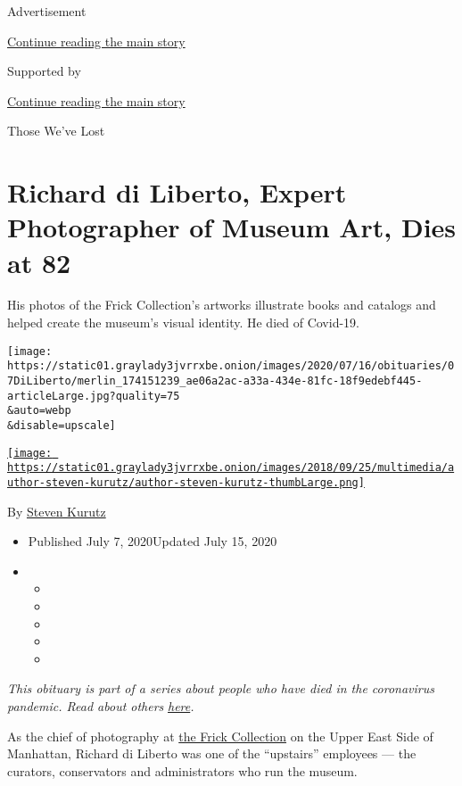 Advertisement

\protect\hyperlink{after-top}{Continue reading the main story}

Supported by

\protect\hyperlink{after-sponsor}{Continue reading the main story}

Those We've Lost

\hypertarget{richard-di-liberto-expert-photographer-of-museum-art-dies-at-82}{%
\section{Richard di Liberto, Expert Photographer of Museum Art, Dies at
82}\label{richard-di-liberto-expert-photographer-of-museum-art-dies-at-82}}

His photos of the Frick Collection's artworks illustrate books and
catalogs and helped create the museum's visual identity. He died of
Covid-19.

\texttt{[image: https://static01.graylady3jvrrxbe.onion/images/2020/07/16/obituaries/07DiLiberto/merlin\_174151239\_ae06a2ac-a33a-434e-81fc-18f9edebf445-articleLarge.jpg?quality=75\\\&auto=webp\\\&disable=upscale]}

\href{https://www.nytimes3xbfgragh.onion/by/steven-kurutz}{\texttt{[image: https://static01.graylady3jvrrxbe.onion/images/2018/09/25/multimedia/author-steven-kurutz/author-steven-kurutz-thumbLarge.png]}}

By \href{https://www.nytimes3xbfgragh.onion/by/steven-kurutz}{Steven
Kurutz}

\begin{itemize}
\item
  Published July 7, 2020Updated July 15, 2020
\item
  \begin{itemize}
  \item
  \item
  \item
  \item
  \item
  \end{itemize}
\end{itemize}

\emph{This obituary is part of a series about people who have died in
the coronavirus pandemic. Read about others}
\href{https://www.nytimes3xbfgragh.onion/interactive/2020/obituaries/people-died-coronavirus-obituaries.html}{\emph{here}}\emph{.}

As the chief of photography at \href{https://www.frick.org/}{the Frick
Collection} on the Upper East Side of Manhattan, Richard di Liberto was
one of the ``upstairs'' employees --- the curators, conservators and
administrators who run the museum.

